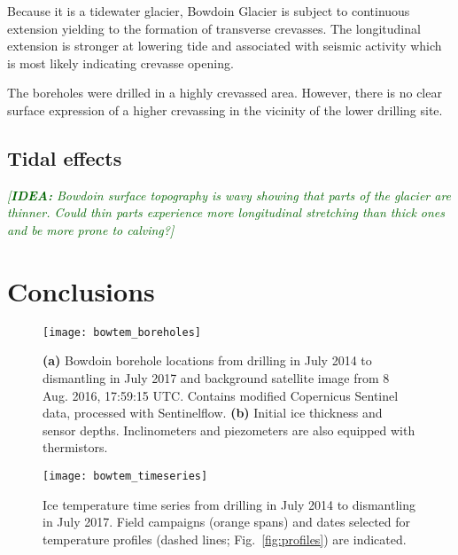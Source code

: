 \documentclass[utf8]{article}
\newcommand{\idea}[1]{\textcolor{darkgreen}{\emph{[\textbf{IDEA:} #1]}}}
\begin{document}
    Because it is a tidewater glacier, Bowdoin Glacier is subject to continuous
    extension yielding to the formation of transverse crevasses. The
    longitudinal extension is stronger at lowering tide and associated with
    seismic activity which is most likely indicating crevasse opening.

    The boreholes were drilled in a highly crevassed area. However, there is
    no clear surface expression of a higher crevassing in the vicinity of the
    lower drilling site.

\subsection{Tidal effects}
    \idea{Bowdoin surface topography is wavy showing that parts of the glacier
          are thinner. Could thin parts experience more longitudinal
          stretching than thick ones and be more prone to calving?}

\section{Conclusions}


\clearpage

    \begin{figure}
      \centerline{\texttt{[image: bowtem\_boreholes]}}
      \caption{\textbf{(a)} Bowdoin borehole locations from drilling in July
               2014 to dismantling in July 2017 and background satellite
               image from 8 Aug. 2016, 17:59:15 UTC. Contains modified
               Copernicus Sentinel data, processed with Sentinelflow.
               \textbf{(b)} Initial ice thickness and sensor depths.
               Inclinometers and piezometers are also equipped with
               thermistors.}
      \label{fig:boreholes}
    \end{figure}

    \begin{figure}
      \centerline{\texttt{[image: bowtem\_timeseries]}}
      \caption{Ice temperature time series from drilling in July 2014 to
               dismantling in July 2017. Field campaigns (orange spans) and
               dates selected for temperature profiles (dashed lines;
               Fig.~\ref{fig:profiles}) are indicated.}
      \label{fig:timeseries}
    \end{figure}
\end{document}
